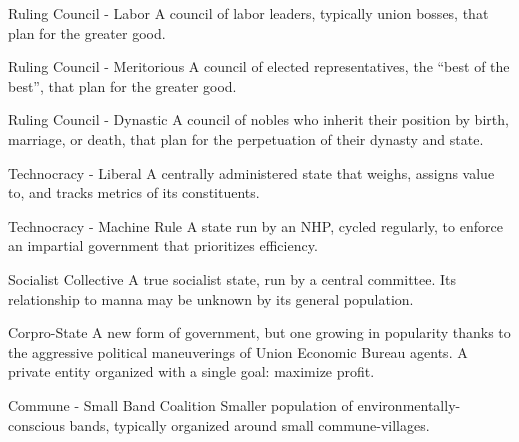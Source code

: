  Ruling Council - Labor                                A council of labor leaders, typically union
                                                       bosses, that plan for the greater good.

 Ruling Council - Meritorious                          A council of elected representatives, the
                                                       ``best of the best'', that plan for the greater
                                                       good.

 Ruling Council - Dynastic                             A council of nobles who inherit their position
                                                       by birth, marriage, or death, that plan for the
                                                       perpetuation of their dynasty and state.

 Technocracy - Liberal                                 A centrally administered state that weighs,
                                                       assigns value to, and tracks metrics of its
                                                       constituents.

 Technocracy - Machine Rule                            A state run by an NHP, cycled regularly, to
                                                       enforce an impartial government that
                                                       prioritizes efficiency.

 Socialist Collective                                  A true socialist state, run by a central
                                                       committee. Its relationship to manna may be
                                                       unknown by its general population.

 Corpro-State                                          A new form of government, but one growing
                                                       in popularity thanks to the aggressive political
                                                       maneuverings of Union Economic Bureau
                                                       agents. A private entity organized with a
                                                       single goal: maximize profit.

 Commune - Small Band Coalition                        Smaller population of environmentally-
                                                       conscious bands, typically organized around
                                                       small commune-villages.

